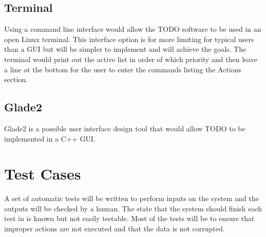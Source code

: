 \documentclass[12pt]{article}
\begin{document}
\subsection{Terminal}
Using a command line interface would allow the TODO software to be used in an open Linux terminal. This interface option is for more limiting for typical users than a GUI but will be simpler to implement and will achieve the goals. The terminal would print out the active list in order of which priority and then leave a line at the bottom for the user to enter the commands listing the Actions section.

\subsection{Glade2}
Glade2 is a possible user interface design tool that would allow TODO to be implemented in a C++ GUI.  


\section{Test Cases}
A set of automatic tests will be written to perform inputs on the system and the outputs will be checked by a human.  The state that the system should finish each test in is known but not easily testable.  Most of the tests will be to ensure that improper actions are not executed and that the data is not corrupted.


\end{document}
